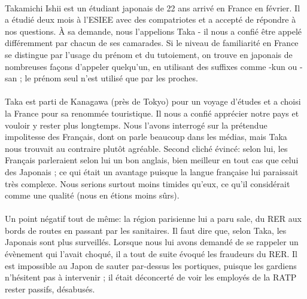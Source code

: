\paragraph{} Takamichi Ishii est un étudiant japonais de 22 ans arrivé en
France en février. Il a étudié deux mois à l'ESIEE avec des compatriotes et a
accepté de répondre à nos questions. À sa demande, nous l'appelions Taka - il
nous a confié être appelé différemment par chacun de ses camarades. Si le
niveau de familiarité en France se distingue par l'usage du prénom et du
tutoiement, on trouve en japonais de nombreuses façons d'appeler quelqu'un, en
utilisant des suffixes comme -kun ou -san ; le prénom seul n'est utilisé que
par les proches.

\paragraph{} Taka est parti de Kanagawa (près de Tokyo) pour un voyage d'études
et a choisi la France pour sa renommée touristique. Il nous a confié apprécier
notre pays et vouloir y rester plus longtemps. Nous l'avons interrogé sur la
prétendue impolitesse des Français, dont on parle beaucoup dans les médias,
mais Taka nous trouvait au contraire plutôt agréable. Second cliché évincé:
selon lui, les Français parleraient selon lui un bon anglais, bien meilleur en
tout cas  que celui des Japonais ; ce qui était un avantage puisque la langue
française lui paraissait très complexe. Nous serions surtout moins timides
qu'eux, ce qu'il considérait comme une qualité (nous en étions moins sûrs).

\paragraph{} Un point négatif tout de même: la région parisienne lui a paru
sale, du RER aux bords de routes en passant par les sanitaires. Il faut dire
que, selon Taka, les Japonais sont plus surveillés. Lorsque nous lui avons
demandé de se rappeler un évènement qui l'avait choqué, il a tout de suite
évoqué les fraudeurs du RER. Il est impossible au Japon de sauter par-dessus
les portiques, puisque les gardiens n'hésitent pas à intervenir ; il était
déconcerté de voir les employés de la RATP rester passifs, désabusés.

